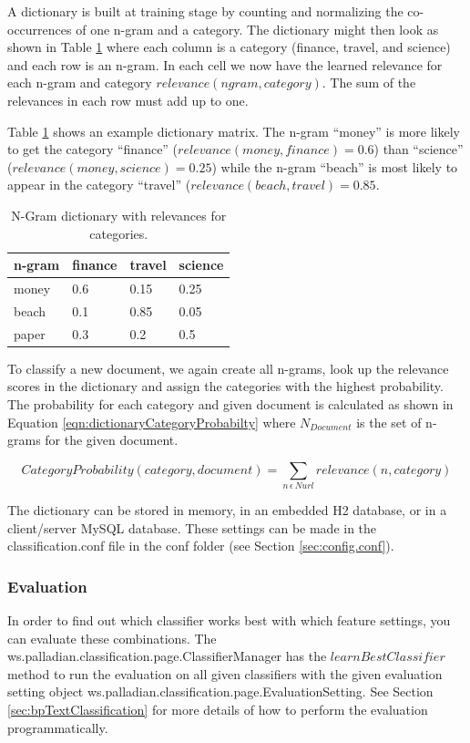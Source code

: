 \documentclass[a4paper,twoside]{book}      %
\begin{document}
A dictionary is built at training stage by counting and normalizing the co-occurrences of one n-gram and a category. The dictionary might then look as shown in Table \ref{tab:dictionary} where each column is a category (finance, travel, and science) and each row is an n-gram. In each cell we now have the learned relevance for each n-gram and category $relevance(ngram,category)$. The sum of the relevances in each row must add up to one.

Table \ref{tab:dictionary} shows an example dictionary matrix. The n-gram ``money'' is more likely to get the category ``finance'' ($relevance(money,finance) = 0.6$) than ``science'' ($relevance(money,science) = 0.25$) while the n-gram ``beach'' is most likely to appear in the category ``travel'' ($relevance(beach,travel) = 0.85$.

\begin{table}[ht]
\centering
\begin{tabular}{|l|l|l|l|}
\hline
n-gram   & finance & travel & science \\
\hline
money	   & 0.6	&	0.15	&	0.25	\\
\hline
beach	& 0.1	&	0.85	&	0.05	\\
\hline
paper	   & 0.3 &	0.2	&	0.5	\\
\hline
\end{tabular} 
\caption{N-Gram dictionary with relevances for categories.}
\label{tab:dictionary}
\end{table}

To classify a new document, we again create all n-grams, look up the relevance scores in the dictionary and assign the categories with the highest probability. The probability for each category and given document is calculated as shown in Equation \ref{eqn:dictionaryCategoryProbabilty} where $N_{Document}$ is the set of n-grams for the given document.

\begin{equation}
\label{eqn:dictionaryCategoryProbabilty}
\mbox{$CategoryProbability(category,document)$} = \sum_{n\,\epsilon\, Nurl} \mbox{$relevance(n,category)$}
\end{equation}

The dictionary can be stored in memory, in an embedded H2 database, or in a client/server MySQL database. These settings can be made in the classification.conf file in the conf folder (see Section \ref{sec:config.conf}).


\subsubsection{Evaluation}
In order to find out which classifier works best with which feature settings, you can evaluate these combinations. The ws.palladian.classification.page.ClassifierManager has the $learnBestClassifier$ method to run the evaluation on all given classifiers with the given evaluation setting object ws.palladian.classification.page.EvaluationSetting. See Section \ref{sec:bpTextClassification} for more details of how to perform the evaluation programmatically.
\end{document}
